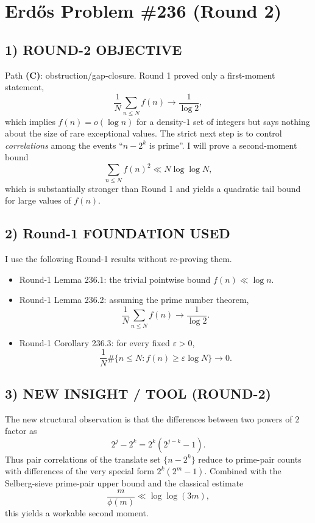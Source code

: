 \section*{Erd\H{o}s Problem \#236 (Round 2)}

\subsection*{1) ROUND-2 OBJECTIVE}

Path \textbf{(C)}: obstruction/gap-closure. Round 1 proved only a first-moment statement,
\[
\frac{1}{N}\sum_{n\le N} f(n)\to \frac{1}{\log 2},
\]
which implies $f(n)=o(\log n)$ for a density-$1$ set of integers but says nothing about the size of rare exceptional values. The strict next step is to control \emph{correlations} among the events ``$n-2^k$ is prime''. I will prove a second-moment bound
\[
\sum_{n\le N} f(n)^2 \ll N\log\log N,
\]
which is substantially stronger than Round 1 and yields a quadratic tail bound for large values of $f(n)$.

\subsection*{2) Round-1 FOUNDATION USED}

I use the following Round-1 results without re-proving them.

\begin{itemize}
\item Round-1 Lemma 236.1: the trivial pointwise bound $f(n)\ll \log n$.
\item Round-1 Lemma 236.2: assuming the prime number theorem,
\[
\frac{1}{N}\sum_{n\le N} f(n)\to \frac{1}{\log 2}.
\]
\item Round-1 Corollary 236.3: for every fixed $\varepsilon>0$,
\[
\frac{1}{N}\#\{n\le N:f(n)\ge \varepsilon \log N\}\to 0.
\]
\end{itemize}

\subsection*{3) NEW INSIGHT / TOOL (ROUND-2)}

The new structural observation is that the differences between two powers of $2$ factor as
\[
2^j-2^k = 2^k(2^{j-k}-1).
\]
Thus pair correlations of the translate set $\{n-2^k\}$ reduce to prime-pair counts with differences of the very special form $2^k(2^m-1)$. Combined with the Selberg-sieve prime-pair upper bound and the classical estimate
\[
\frac{m}{\phi(m)}\ll \log\log(3m),
\]
this yields a workable second moment.

